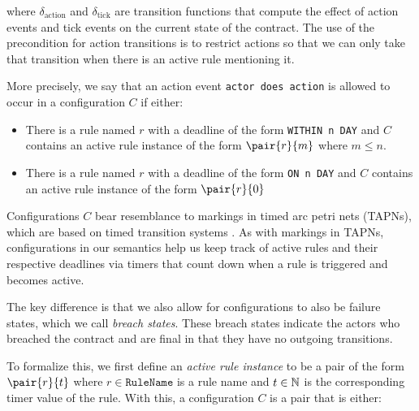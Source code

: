 \documentclass{article}
\begin{document}
where $\delta_\text{action}$ and $\delta_\text{tick}$ are transition functions
that compute the effect of action events and tick events on the current state
of the contract.
The use of the precondition for action transitions is to restrict actions so
that we can only take that transition when there is an active rule mentioning it.

More precisely, we say that an action event \texttt{actor does action} is allowed
to occur in a configuration $C$ if either:

\begin{itemize}
  \item
  There is a rule named $r$ with a deadline of the form
  \texttt{WITHIN n DAY}
  and $C$ contains an active rule instance of the form
  $\pair{r}{m}$ where $m \leq n$.

  \item
  There is a rule named $r$ with a deadline of the form
  \texttt{ON n DAY}
  and $C$ contains an active rule instance of the form
  $\pair{r}{0}$
\end{itemize}

Configurations $C$ bear resemblance to markings in timed arc petri nets
(TAPNs), which are based on timed transition systems .
As with markings in TAPNs, configurations in our semantics help us keep
track of active rules and their respective deadlines via timers that count down
when a rule is triggered and becomes active.

The key difference is that we also allow for configurations to also be failure
states, which we call \textit{breach states}.
These breach states indicate the actors who breached the contract and are final
in that they have no outgoing transitions.



To formalize this, we first define an \textit{active rule instance} to be a
pair of the form $\pair{r}{t}$ where $r \in \texttt{RuleName}$ is a rule name
and $t \in \operatorname{\mathbb{N}}$ is the corresponding timer value of the rule.
With this, a configuration $C$ is a pair that is either:
\end{document}
